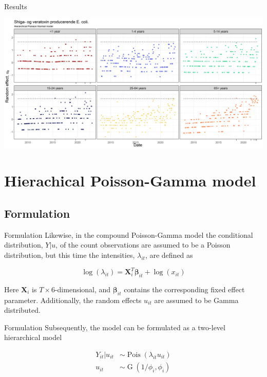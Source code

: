 \documentclass[aspectratio=169]{beamer}
\DeclareMathOperator{\G}{G}
\DeclareMathOperator{\Pois}{Pois}
\begin{document}
\begin{frame}{Results}
\protect\hypertarget{results-1}{}
\tiny

\includegraphics[width=1\linewidth]{../figures/PoisLNxSTEC}

\normalsize
\end{frame}

\hypertarget{hierachical-poisson-gamma-model}{%
\section{Hierachical Poisson-Gamma
model}\label{hierachical-poisson-gamma-model}}

\hypertarget{formulation-1}{%
\subsection{Formulation}\label{formulation-1}}

\begin{frame}{Formulation}
Likewise, in the compound Poisson-Gamma model the conditional
distribution, \(Y|u\), of the count observations are assumed to be a
Poisson distribution, but this time the intensities, \(\lambda_{it}\),
are defined as

\begin{equation}
  \log(\lambda_{it})=\mathbf{X}_i^T\mathbf{\beta}_{it}+\log(x_{it})
\end{equation}

Here \(\mathbf{X}_i\) is \(T\times6\)-dimensional, and
\(\mathbf{\beta}_{it}\) contains the corresponding fixed effect
parameter. Additionally, the random effects \(u_{it}\) are assumed to be
Gamma distributed.
\end{frame}

\begin{frame}{Formulation}
\protect\hypertarget{formulation-2}{}
Subsequently, the model can be formulated as a two-level hierarchical
model

\begin{subequations} \label{eq:PoisGam}
  \begin{alignat}{2}
    Y_{it}|u_{it} &\sim \Pois (\lambda_{it}u_{it}) \label{eq:pois_g0} \\ 
    u_{it} &\sim \G(1/\phi_{i},\phi_{i}) \label{eq:pois_g1}
  \end{alignat}
\end{subequations}
\end{frame}
\end{document}
